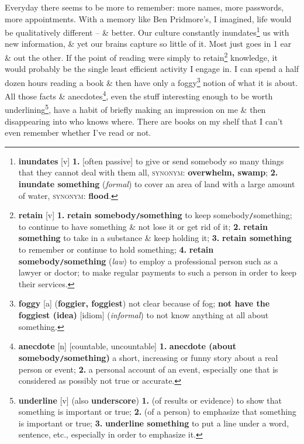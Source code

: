 \documentclass[oneside]{book}
\numberwithin{equation}{section}
\begin{document}
Everyday there seems to be more to remember: more names, more passwords, more appointments. With a memory like Ben Pridmore's, I imagined, life would be qualitatively different -- \& better. Our culture constantly inundates\footnote{\textbf{inundates} [v] \textbf{1.} [often passive] to give or send somebody so many things that they cannot deal with them all, \textsc{synonym}: \textbf{overwhelm, swamp}; \textbf{2.} \textbf{inundate something} (\textit{formal}) to cover an area of land with a large amount of water, \textsc{synonym}: \textbf{flood}.} us with new information, \& yet our brains capture so little of it. Most just goes in 1 ear \& out the other. If the point of reading were simply to retain\footnote{\textbf{retain} [v] \textbf{1.} \textbf{retain somebody\texttt{/}something} to keep somebody\texttt{/}something; to continue to have something \& not lose it or get rid of it; \textbf{2.} \textbf{retain something} to take in a substance \& keep holding it; \textbf{3.} \textbf{retain something} to remember or continue to hold something; \textbf{4.} \textbf{retain somebody\texttt{/}something} (\textit{law}) to employ a professional person such as a lawyer or doctor; to make regular payments to such a person in order to keep their services.} knowledge, it would probably be the single least efficient activity I engage in. I can spend a half dozen hours reading a book \& then have only a foggy\footnote{\textbf{foggy} [a] (\textbf{foggier, foggiest}) not clear because of fog; \textbf{not have the foggiest (idea)} [idiom] (\textit{informal}) to not know anything at all about something.} notion of what it is about. All those facts \& anecdotes\footnote{\textbf{anecdote} [n] [countable, uncountable] \textbf{1.} \textbf{anecdote (about somebody\texttt{/}something)} a short, increasing or funny story about a real person or event; \textbf{2.} a personal account of an event, especially one that is considered as possibly not true or accurate.}, even the stuff interesting enough to be worth underlining\footnote{\textbf{underline} [v] (also \textbf{underscore}) \textbf{1.} (of results or evidence) to show that something is important or true; \textbf{2.} (of a person) to emphasize that something is important or true; \textbf{3.} \textbf{underline something} to put a line under a word, sentence, etc., especially in order to emphasize it.}, have a habit of briefly making an impression on me \& then disappearing into who knows where. There are books on my shelf that I can't even remember whether I've read or not.
\end{document}
